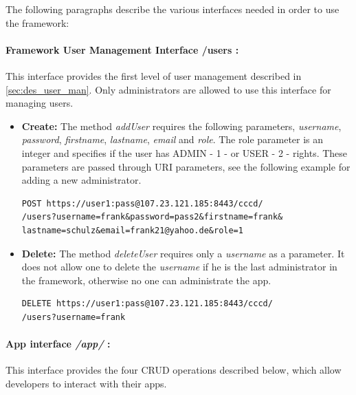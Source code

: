 The following paragraphs describe the various interfaces needed in order to use the framework:

\paragraph{Framework User Management Interface /users :} This interface provides the first level of user management described in \ref{sec:des_user_man}. Only administrators are allowed to use this interface for managing users.

\begin{itemize}
\item \textbf{Create:} The method \textit{addUser} requires the following parameters, \textit{username}, \textit{password}, \textit{firstname}, \textit{lastname}, \textit{email} and \textit{role}.  The role parameter is an integer and specifies if the user has ADMIN - 1 - or USER - 2 - rights. These parameters are passed through \ac{URI} parameters, see the following example for adding a new administrator.

\begin{code}
\begin{verbatim}
POST https://user1:pass@107.23.121.185:8443/cccd/
/users?username=frank&password=pass2&firstname=frank&
lastname=schulz&email=frank21@yahoo.de&role=1
\end{verbatim}
\end{code}

\item \textbf{Delete:} The method \textit{deleteUser} requires only a \textit{username} as a parameter. It does not allow one to delete the \textit{username} if he is the last administrator in the framework, otherwise no one can administrate the app.

\begin{code}
\begin{verbatim}
DELETE https://user1:pass@107.23.121.185:8443/cccd/
/users?username=frank
\end{verbatim}
\end{code}

\end{itemize}


\paragraph{App interface \textit{/app/} :} This interface provides the four \ac{CRUD} operations described below, which allow developers to interact with their apps.

